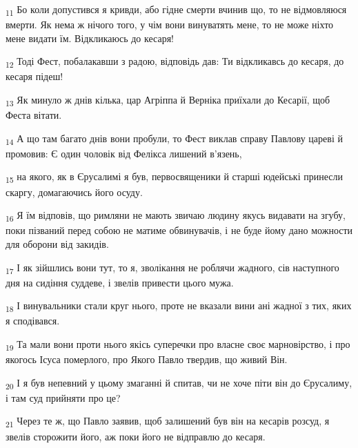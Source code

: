 \begin{tcolorbox}
\textsubscript{11} Бо коли допустився я кривди, або гідне смерти вчинив що, то не відмовляюся вмерти. Як нема ж нічого того, у чім вони винуватять мене, то не може ніхто мене видати їм. Відкликаюсь до кесаря!
\end{tcolorbox}
\begin{tcolorbox}
\textsubscript{12} Тоді Фест, побалакавши з радою, відповідь дав: Ти відкликавсь до кесаря, до кесаря підеш!
\end{tcolorbox}
\begin{tcolorbox}
\textsubscript{13} Як минуло ж днів кілька, цар Агріппа й Верніка приїхали до Кесарії, щоб Феста вітати.
\end{tcolorbox}
\begin{tcolorbox}
\textsubscript{14} А що там багато днів вони пробули, то Фест виклав справу Павлову цареві й промовив: Є один чоловік від Фелікса лишений в'язень,
\end{tcolorbox}
\begin{tcolorbox}
\textsubscript{15} на якого, як в Єрусалимі я був, первосвященики й старші юдейські принесли скаргу, домагаючись його осуду.
\end{tcolorbox}
\begin{tcolorbox}
\textsubscript{16} Я їм відповів, що римляни не мають звичаю людину якусь видавати на згубу, поки пізваний перед собою не матиме обвинувачів, і не буде йому дано можности для оборони від закидів.
\end{tcolorbox}
\begin{tcolorbox}
\textsubscript{17} І як зійшлись вони тут, то я, зволікання не роблячи жадного, сів наступного дня на сидіння суддеве, і звелів привести цього мужа.
\end{tcolorbox}
\begin{tcolorbox}
\textsubscript{18} І винувальники стали круг нього, проте не вказали вини ані жадної з тих, яких я сподівався.
\end{tcolorbox}
\begin{tcolorbox}
\textsubscript{19} Та мали вони проти нього якісь суперечки про власне своє марновірство, і про якогось Ісуса померлого, про Якого Павло твердив, що живий Він.
\end{tcolorbox}
\begin{tcolorbox}
\textsubscript{20} І я був непевний у цьому змаганні й спитав, чи не хоче піти він до Єрусалиму, і там суд прийняти про це?
\end{tcolorbox}
\begin{tcolorbox}
\textsubscript{21} Через те ж, що Павло заявив, щоб залишений був він на кесарів розсуд, я звелів сторожити його, аж поки його не відправлю до кесаря.
\end{tcolorbox}
